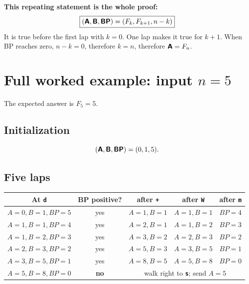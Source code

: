 \documentclass[11pt,a4paper]{article}
\newcommand{\op}[1]{\texttt{\bfseries #1}}
\newcommand{\reg}[1]{\textsf{\bfseries #1}}
\newcommand{\Fib}[1]{F_{#1}}
\begin{document}
\begin{keybox}
  \textbf{This repeating statement is the whole proof:}
  \[
    \boxed{
      (\reg{A},\reg{B},\reg{BP})
      =
      (\Fib{k},\Fib{k+1},n-k)
    }
  \]
  It is true before the first lap with \(k=0\). One lap makes it true for
  \(k+1\). When BP reaches zero, \(n-k=0\), therefore \(k=n\), therefore
  \(\reg{A}=\Fib{n}\).
\end{keybox}

\section{Full worked example: input \texorpdfstring{\(n=5\)}{n=5}}

The expected answer is \(\Fib5=5\).

\subsection{Initialization}

\[
  (\reg{A},\reg{B},\reg{BP})=(0,1,5).
\]

\subsection{Five laps}

\begin{center}
\begin{tabular}{c|c|c|c|c}
  \toprule
  \textbf{At \op{d}} & \textbf{BP positive?} &
  \textbf{after \op{+}} & \textbf{after \op{W}} &
  \textbf{after \op{m}}\\
  \midrule
  \(A=0,B=1,BP=5\) & yes & \(A=1,B=1\) & \(A=1,B=1\) & \(BP=4\)\\
  \(A=1,B=1,BP=4\) & yes & \(A=2,B=1\) & \(A=1,B=2\) & \(BP=3\)\\
  \(A=1,B=2,BP=3\) & yes & \(A=3,B=2\) & \(A=2,B=3\) & \(BP=2\)\\
  \(A=2,B=3,BP=2\) & yes & \(A=5,B=3\) & \(A=3,B=5\) & \(BP=1\)\\
  \(A=3,B=5,BP=1\) & yes & \(A=8,B=5\) & \(A=5,B=8\) & \(BP=0\)\\
  \(A=5,B=8,BP=0\) & \textbf{no} &
  \multicolumn{3}{c}{walk right to \op{s}; send \(A=5\)}\\
  \bottomrule
\end{tabular}
\end{center}
\end{document}
